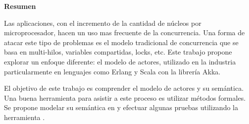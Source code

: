 \begin{center}
\begin{LARGE}\textbf{Resumen}\end{LARGE}
\end{center}

\noindent
Las aplicaciones, con el incremento de la cantidad de núcleos por microprocesador, hacen un uso mas frecuente de la concurrencia. Una forma de atacar este tipo de problemas es el modelo tradicional de concurrencia que se basa en multi-hilos, variables compartidas, locks, etc. Este trabajo propone explorar un enfoque diferente: el modelo de actores, utilizado en la industria particularmente en lenguajes como Erlang y Scala con la librería Akka.

\noindent
El objetivo de este trabajo es comprender el modelo de actores y su semántica. Una buena herramienta para asistir a este proceso es utilizar métodos formales. Se propone modelar su semántica en \CSP y efectuar algunas pruebas utilizando la herramienta \FDR.


